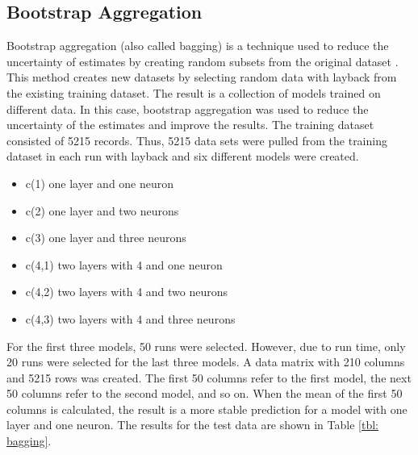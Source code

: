 	
	\subsection{Bootstrap Aggregation} \label{subsec: boot}
	Bootstrap aggregation (also called bagging) is a technique used to reduce the uncertainty of estimates by creating random subsets from the original dataset \cite{Bootstrap}. This method creates new datasets by selecting random data with layback from the existing training dataset. The result is a collection of models trained on different data. In this case, bootstrap aggregation was used to reduce the uncertainty of the estimates and improve the results. The training dataset consisted of 5215 records. Thus, 5215 data sets were pulled from the training dataset in each run with layback and six different models were created.


	 \begin{itemize}
	 	\item c(1) one layer and one neuron
	 	\item c(2) one layer and two neurons
	 	\item c(3) one layer and three neurons
	 	\item c(4,1) two layers with 4 and one neuron
	 	\item c(4,2) two layers with 4 and two neurons
	 	\item c(4,3) two layers with 4 and three neurons
	 \end{itemize}
	 
	 For the first three models, 50 runs were selected. However, due to run time, only 20 runs were selected for the last three models. A data matrix with 210 columns and 5215 rows was created. The first 50 columns refer to the first model, the next 50 columns refer to the second model, and so on. When the mean of the first 50 columns is calculated, the result is a more stable prediction for a model with one layer and one neuron. The results for the test data are shown in Table \ref{tbl: bagging}.

	          

